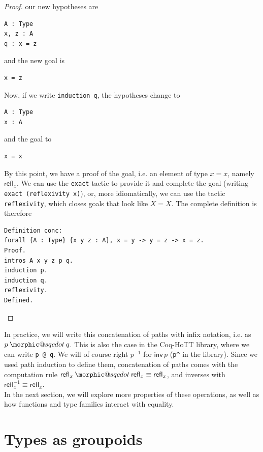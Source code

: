 \documentclass[12 pt]{amsart}
\makeatletter
\theoremstyle{definition}
\theoremstyle{remark}
\newcommand{\refl}{\mathsf{refl}}
\DeclareRobustCommand{\conc}{\mathbin{\mathpalette\morphic@sqcdot\relax}}
\newcommand{\morphic@sqcdot}[2]{%
    \sbox\z@{$\m@th#1\centerdot$}%
    \ht\z@=.33333\ht\z@
    \vcenter{\box\z@}%
    }
\makeatother
\begin{document}
\begin{proof}
our new hypotheses are

\begin{lstlisting}
A : Type
x, z : A
q : x = z
\end{lstlisting}

and the new goal is

\begin{lstlisting}
x = z
\end{lstlisting}

Now, if we write \texttt{induction q}, the hypotheses change to 

\begin{lstlisting}
A : Type
x : A
\end{lstlisting}

and the goal to

\begin{lstlisting}
x = x
\end{lstlisting}

By this point, we have a proof of the goal, i.e. an element of type $x = x$, namely $\refl_x$. We can use the \texttt{exact} tactic to provide it and complete the goal (writing \texttt{exact (reflexivity x)}), or, more idiomatically, we can use the tactic \texttt{reflexivity}, which closes goals that look like $X = X$. The complete definition is therefore

\begin{lstlisting}
Definition conc: 
forall {A : Type} {x y z : A}, x = y -> y = z -> x = z.
Proof.
intros A x y z p q.
induction p.
induction q.
reflexivity.
Defined. 
\end{lstlisting}

\end{proof}

 In practice, we will write this concatenation of paths with infix notation, i.e. as $p \conc q$. This is also the case in the Coq-HoTT library, where we can write \texttt{p @ q}. We will of course right $p^{-1}$ for $\mathsf{inv}\, p$ (\texttt{p\^{}} in the library). Since we used path induction to define them, concatenation of paths comes with the computation rule $\refl_{x} \conc \refl_{x} \equiv \refl_{x}$, and inverses with $\refl_{x}^{-1} \equiv \refl_{x}$.\\
 
In the next section, we will explore more properties of these operations, as well as how functions and type families interact with equality.

\section{Types as groupoids}
\end{document}
